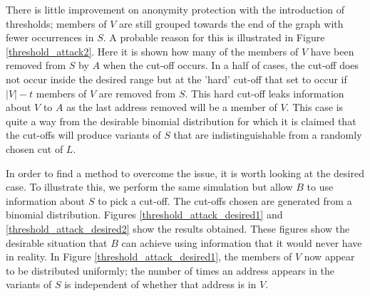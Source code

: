 \documentclass[ %
                    author={Luke Murray},
                supervisor={Dr. Simon Hollis},
                     title={Shadow Peer-to-Peer Networks},
                  subtitle={},
                    degree={MEng},
                      year={2013} ]{thesis}
\begin{document}
There is little improvement on anonymity protection with the introduction of thresholds; members of $V$ are still grouped towards the end of the graph with fewer occurrences in $S$. A probable reason for this is illustrated in Figure \ref{threshold_attack2}. Here it is shown how many of the members of $V$ have been removed from $S$ by $A$ when the cut-off occurs. In a half of cases, the cut-off does not occur inside the desired range but at the 'hard' cut-off that set to occur if $|V| - t$ members of $V$ are removed from $S$. This hard cut-off leaks information about $V$ to $A$ as the last address removed will be a member of $V$. This case is quite a way from the desirable binomial distribution for which it is claimed that the cut-offs will produce variants of $S$ that are indistinguishable from a randomly chosen cut of $L$.

In order to find a method to overcome the issue, it is worth looking at the desired case. To illustrate this, we perform the same simulation but allow $B$ to use information about $S$ to pick a cut-off. The cut-offs chosen are generated from a binomial distribution. Figures \ref{threshold_attack_desired1} and \ref{threshold_attack_desired2} show the results obtained. These figures show the desirable situation that $B$ can achieve using information that it would never have in reality. In Figure \ref{threshold_attack_desired1}, the members of $V$ now appear to be distributed uniformly; the number of times an address appears in the variants of $S$ is independent of whether that address is in $V$.
\end{document}
